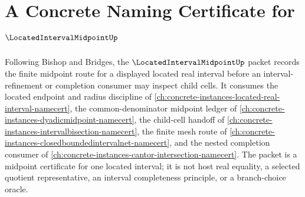 \chapter{A Concrete Naming Certificate for $\LocatedIntervalMidpointUp$}
\label{ch:concrete-instances-located-interval-midpoint-namecert}

Following Bishop and Bridges, the $\LocatedIntervalMidpointUp$ packet records the finite midpoint route for a displayed located real interval before an interval-refinement or completion consumer may inspect child cells. It consumes the located endpoint and radius discipline of \autoref{ch:concrete-instances-located-real-interval-namecert}, the common-denominator midpoint ledger of \autoref{ch:concrete-instances-dyadicmidpoint-namecert}, the child-cell handoff of \autoref{ch:concrete-instances-intervalbisection-namecert}, the finite mesh route of \autoref{ch:concrete-instances-closedboundedintervalnet-namecert}, and the nested completion consumer of \autoref{ch:concrete-instances-cantor-intersection-namecert}. The packet is a midpoint certificate for one located interval; it is not host real equality, a selected quotient representative, an interval completeness principle, or a branch-choice oracle.

